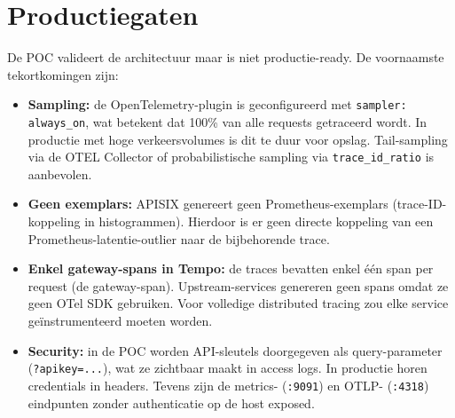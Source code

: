 \section{Productiegaten}%
\label{sec:bevinding-productiegaten}

De POC valideert de architectuur maar is niet productie-ready. De voornaamste tekortkomingen zijn:

\begin{itemize}
  \item \textbf{Sampling:} de OpenTelemetry-plugin is geconfigureerd met \texttt{sampler: always\_on}, wat betekent dat 100\% van alle requests getraceerd wordt. In productie met hoge verkeersvolumes is dit te duur voor opslag. Tail-sampling via de OTEL Collector of probabilistische sampling via \texttt{trace\_id\_ratio} is aanbevolen.
  \item \textbf{Geen exemplars:} APISIX genereert geen Prometheus-exemplars (trace-ID-koppeling in histogrammen). Hierdoor is er geen directe koppeling van een Prometheus-latentie-outlier naar de bijbehorende trace.
  \item \textbf{Enkel gateway-spans in Tempo:} de traces bevatten enkel één span per request (de gateway-span). Upstream-services genereren geen spans omdat ze geen OTel SDK gebruiken. Voor volledige distributed tracing zou elke service geïnstrumenteerd moeten worden.
  \item \textbf{Security:} in de POC worden API-sleutels doorgegeven als query-parameter (\texttt{?apikey=...}), wat ze zichtbaar maakt in access logs. In productie horen credentials in headers. Tevens zijn de metrics- (\texttt{:9091}) en OTLP- (\texttt{:4318}) eindpunten zonder authenticatie op de host exposed.
\end{itemize}
